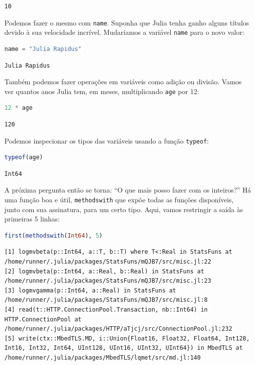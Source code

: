 \documentclass[
  notoc %
]{tufte-book}
\newcommand{\passthrough}[1]{#1}
\begin{document}
\begin{lstlisting}[language=Output]
10
\end{lstlisting}

Podemos fazer o mesmo com \passthrough{\lstinline!name!}. Suponha que
Julia tenha ganho alguns títulos devido à sua velocidade incrível.
Mudaríamos a variável \passthrough{\lstinline!name!} para o novo valor:

\begin{lstlisting}[language=Julia]
name = "Julia Rapidus"
\end{lstlisting}

\begin{lstlisting}[language=Output]
Julia Rapidus
\end{lstlisting}

Também podemos fazer operações em variáveis como adição ou divisão.
Vamos ver quantos anos Julia tem, em meses, multiplicando
\passthrough{\lstinline!age!} por 12:

\begin{lstlisting}[language=Julia]
12 * age
\end{lstlisting}

\begin{lstlisting}[language=Output]
120
\end{lstlisting}

Podemos inspecionar os tipos das variáveis usando a função
\passthrough{\lstinline!typeof!}:

\begin{lstlisting}[language=Julia]
typeof(age)
\end{lstlisting}

\begin{lstlisting}[language=Output]
Int64
\end{lstlisting}

A próxima pergunta então se torna: ``O que mais posso fazer com os
inteiros?'' Há uma função boa e útil,
\passthrough{\lstinline!methodswith!} que expõe todas as funções
disponíveis, junto com sua assinatura, para um certo tipo. Aqui, vamos
restringir a saída às primeiras 5 linhas:

\begin{lstlisting}[language=Julia]
first(methodswith(Int64), 5)
\end{lstlisting}

\begin{lstlisting}[language=Output]
[1] logmvbeta(p::Int64, a::T, b::T) where T<:Real in StatsFuns at /home/runner/.julia/packages/StatsFuns/mQJB7/src/misc.jl:22
[2] logmvbeta(p::Int64, a::Real, b::Real) in StatsFuns at /home/runner/.julia/packages/StatsFuns/mQJB7/src/misc.jl:23
[3] logmvgamma(p::Int64, a::Real) in StatsFuns at /home/runner/.julia/packages/StatsFuns/mQJB7/src/misc.jl:8
[4] read(t::HTTP.ConnectionPool.Transaction, nb::Int64) in HTTP.ConnectionPool at /home/runner/.julia/packages/HTTP/aTjcj/src/ConnectionPool.jl:232
[5] write(ctx::MbedTLS.MD, i::Union{Float16, Float32, Float64, Int128, Int16, Int32, Int64, UInt128, UInt16, UInt32, UInt64}) in MbedTLS at /home/runner/.julia/packages/MbedTLS/lqmet/src/md.jl:140
\end{lstlisting}
\end{document}
